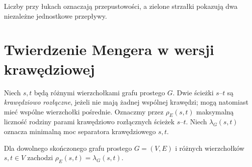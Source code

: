 \begin{center}

{\footnotesize Liczby przy łukach oznaczają przepustowości,
a zielone strzałki pokazują dwa niezależne jednostkowe przepływy.}
\end{center}

\section{Twierdzenie Mengera w wersji krawędziowej}
\label{sec:tg-menger-edges}

\begin{definicja}
Niech $s,t$ będą różnymi wierzchołkami grafu prostego $G$.
Dwie ścieżki $s$--$t$ są \emph{krawędziowo rozłączne},
jeżeli nie mają żadnej wspólnej krawędzi; mogą natomiast
mieć wspólne wierzchołki pośrednie. Oznaczmy przez
$\rho_E(s,t)$ maksymalną liczność rodziny parami
krawędziowo rozłącznych ścieżek $s$--$t$.
Niech $\lambda_G(s,t)$ oznacza minimalną moc separatora
krawędziowego $s,t$.
\end{definicja}

\begin{twierdzenie}
\label{thm:tg-menger-edge}
Dla dowolnego skończonego grafu prostego $G=(V,E)$
i różnych wierzchołków $s,t\in V$ zachodzi
$\rho_E(s,t)=\lambda_G(s,t)$.
\end{twierdzenie}

